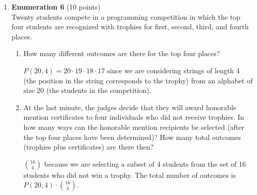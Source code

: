 \begin{enumerate}
  \item \textbf{Enumeration 6} (10 points)\\
  Twenty students compete in a programming competition in which the top four students are 
  recognized with trophies for first, second, third, and fourth places.
  \begin{enumerate}[label=\alph*.]
    \item How many different outcomes are there for the top four places?
    \begin{subanswer}
      $P(20,4) = 20 \cdot 19 \cdot 18 \cdot 17$ since we are considering strings of length 4 
      (the position in the string corresponds to the trophy) from an alphabet of size 20 (the 
      students in the competition).\\
    \end{subanswer}
    \item At the last minute, the judges decide that they will award honorable mention 
    certificates to four individuals who did not receive trophies. In how many ways can the 
    honorable mention recipients be selected (after the top four places have been determined)? 
    How many total outcomes (trophies plus certificates) are there then?
    \begin{subanswer}
      $\binom{16}{4}$ because we are selecting a subset of 4 students from the set of 16 
      students who did not win a trophy. The total number of outcomes is 
      $P(20,4) \cdot \binom{16}{4}$.
    \end{subanswer}
  \end{enumerate}




  \newpage



\end{enumerate}
